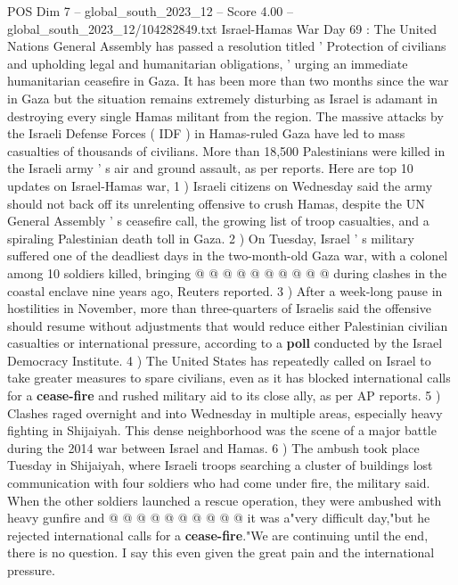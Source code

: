 \begin{textsample}{POS Dim 7 – global\_south\_2023\_12 – Score 4.00 – global\_south\_2023\_12/104282849.txt}  \label{ex:f7_pos_266}
Israel-Hamas War Day 69 : The United Nations General Assembly has passed a resolution titled ' Protection of civilians and upholding legal and humanitarian obligations, ' urging an immediate humanitarian ceasefire in Gaza.
It has been more than two months since the war in Gaza but the situation remains extremely disturbing as Israel is adamant in destroying every single Hamas militant from the region.
The massive attacks by the Israeli Defense Forces ( IDF ) in Hamas-ruled Gaza have led to mass casualties of thousands of civilians.
More than 18,500 Palestinians were killed in the Israeli army ' s air and ground assault, as per reports.
Here are top 10 updates on Israel-Hamas war, 1 ) Israeli citizens on Wednesday said the army should not back off its unrelenting offensive to crush Hamas, despite the UN General Assembly ' s ceasefire call, the growing list of troop casualties, and a spiraling Palestinian death toll in Gaza. 2 ) On Tuesday, Israel ' s military suffered one of the deadliest days in the two-month-old Gaza war, with a colonel among 10 soldiers killed, bringing @ @ @ @ @ @ @ @ @ @ during clashes in the coastal enclave nine years ago, Reuters reported. 3 ) After a week-long pause in hostilities in November, more than three-quarters of Israelis said the offensive should resume without adjustments that would reduce either Palestinian civilian casualties or international pressure, according to a \textbf{poll} conducted by the Israel Democracy Institute. 4 ) The United States has repeatedly called on Israel to take greater measures to spare civilians, even as it has blocked international calls for a \textbf{cease-fire} and rushed military aid to its close ally, as per AP reports. 5 ) Clashes raged overnight and into Wednesday in multiple areas, especially heavy fighting in Shijaiyah.
This dense neighborhood was the scene of a major battle during the 2014 war between Israel and Hamas. 6 ) The ambush took place Tuesday in Shijaiyah, where Israeli troops searching a cluster of buildings lost communication with four soldiers who had come under fire, the military said.
When the other soldiers launched a rescue operation, they were ambushed with heavy gunfire and @ @ @ @ @ @ @ @ @ @ it was a"very difficult day,"but he rejected international calls for a \textbf{cease-fire}."We are continuing until the end, there is no question.
I say this even given the great pain and the international pressure.

\end{textsample}
